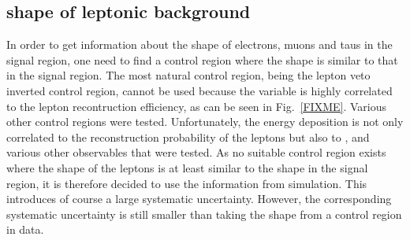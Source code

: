 \renewcommand{\arraystretch}{1.4}
\begin{table}[!h]
\centering
\caption{Scaling factor $\rho_{\text{MC}}$, number of events in the control region in data N$_{\text{CR,data}}$ and the resulting inclusive estimation N$_{\text{predicted}}$ after the candidate track selection.}
\label{tab:LeptonicResults}
\end{table}



\subsection*{\ias shape of leptonic background}
In order to get information about the \ias shape of electrons, muons and taus in the signal region, one need to find a control region where the shape is similar to that in the signal region.
The most natural control region, being the lepton veto inverted control region, cannot be used because the variable \ias is highly correlated to the lepton recontruction efficiency, as can be seen in Fig.~\ref{FIXME}.
Various other control regions were tested.
Unfortunately, the energy deposition is not only correlated to the reconstruction probability of the leptons but also to \ecalo, \pt and various other observables that were tested.
As no suitable control region exists where the \ias shape of the leptons is at least similar to the shape in the signal region, it is therefore decided to use the \ias information from simulation.
This introduces of course a large systematic uncertainty.
However, the corresponding systematic uncertainty is still smaller than taking the \ias shape from a control region in data.


